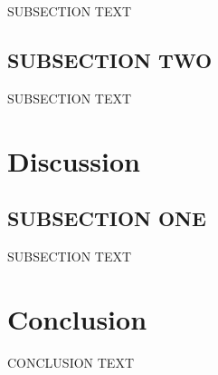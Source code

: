 \documentclass[letterpaper, 10 pt, conference]{ieeeconf}  %
\begin{document}
SUBSECTION TEXT

\subsection{SUBSECTION TWO}

SUBSECTION TEXT

\section{Discussion}

\subsection{SUBSECTION ONE}

SUBSECTION TEXT

\section{Conclusion}

CONCLUSION TEXT



\end{document}
